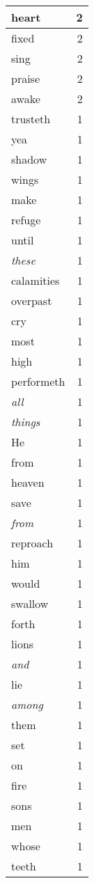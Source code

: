 \begin{center}
\begin{longtable}{l|r}
heart & 2 \\ \hline
fixed & 2 \\ \hline
sing & 2 \\ \hline
praise & 2 \\ \hline
awake & 2 \\ \hline
trusteth & 1 \\ \hline
yea & 1 \\ \hline
shadow & 1 \\ \hline
wings & 1 \\ \hline
make & 1 \\ \hline
refuge & 1 \\ \hline
until & 1 \\ \hline
\emph{these} & 1 \\ \hline
calamities & 1 \\ \hline
overpast & 1 \\ \hline
cry & 1 \\ \hline
most & 1 \\ \hline
high & 1 \\ \hline
performeth & 1 \\ \hline
\emph{all} & 1 \\ \hline
\emph{things} & 1 \\ \hline
He & 1 \\ \hline
from & 1 \\ \hline
heaven & 1 \\ \hline
save & 1 \\ \hline
\emph{from} & 1 \\ \hline
reproach & 1 \\ \hline
him & 1 \\ \hline
would & 1 \\ \hline
swallow & 1 \\ \hline
forth & 1 \\ \hline
lions & 1 \\ \hline
\emph{and} & 1 \\ \hline
lie & 1 \\ \hline
\emph{among} & 1 \\ \hline
them & 1 \\ \hline
set & 1 \\ \hline
on & 1 \\ \hline
fire & 1 \\ \hline
sons & 1 \\ \hline
men & 1 \\ \hline
whose & 1 \\ \hline
teeth & 1 \\ \hline

\end{longtable}
\end{center}
